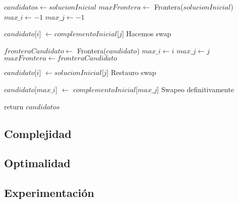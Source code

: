 \begin{algorithm}[H]
\begin{algorithmic}

    \State $candidatos \gets solucionInicial$
    \State $maxFrontera \gets$ Frontera($solucionInicial$)
    \State $max\_i \gets -1$
    \State $max\_j \gets -1$

    \For{$i \in [0..|solucionInicial|)$}
        \For{$j \in [0..|complementoInicial|)$}

            \State $candidato$[$i$] $\gets complementoInicial$[$j$] \Comment Hacemos swap

                \State $fronteraCandidato \gets$ Frontera($candidato$)
                    \State $max\_i \gets i$
                    \State $max\_j \gets j$
                    \State $maxFrontera \gets fronteraCandidato$
                \EndIf
            \EndIf

            \State $candidato$[$i$] $\gets solucionInicial$[$j$] \Comment Restauro swap
        \EndFor
    \EndFor

        \State $candidato$[$max\_i$] $\gets$ $complementoInicial$[$max\_j$] \Comment Swapeo definitivamente
    \EndIf

    \State return $candidatos$

\EndFunction
\end{algorithmic}
\end{algorithm}



\begin{algorithm}[H]
\begin{algorithmic}
\EndFunction
\end{algorithmic}
\end{algorithm}


\begin{algorithm}[H]
\begin{algorithmic}
\EndFunction
\end{algorithmic}
\end{algorithm}


\begin{algorithm}[H]
\begin{algorithmic}
\EndFunction
\end{algorithmic}
\end{algorithm}


\subsection{Complejidad}

\subsection{Optimalidad}

\subsection{Experimentación}
